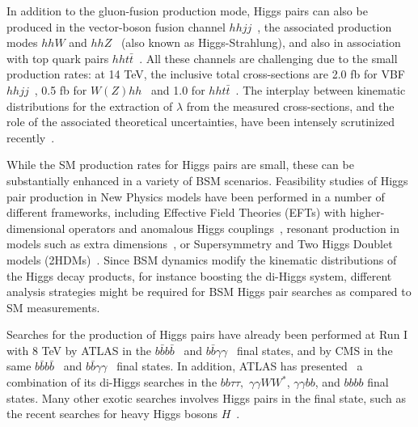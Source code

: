 In addition to the gluon-fusion production mode, Higgs pairs
can also be produced in the vector-boson fusion
channel $hhjj$~\cite{Contino:2010mh,Dolan:2013rja,Dolan:2015zja,
  Brooijmans:2014eja},
the associated production modes
$hhW$ and $hhZ$~\cite{Barger:1988jk,baglio,Cao:2015oxx}
(also known as Higgs-Strahlung),
and also in association
with top quark pairs $hht\bar{t}$~\cite{Englert:2014uqa}.
%
All these channels are challenging due to the small production
rates: at 14 TeV, the inclusive total cross-sections are
2.0 fb for VBF $hhjj$~\cite{Liu-Sheng:2014gxa},
0.5 fb for $W(Z)hh$~\cite{baglio}
and 1.0 for $hht\bar{t}$~\cite{Englert:2014uqa}.
%
The interplay between  kinematic
distributions for the
extraction of $\lambda$ from the measured
cross-sections, and the role of the associated theoretical
uncertainties, have been intensely scrutinized
recently~\cite{Slawinska:2014vpa,Chen:2014xra,Goertz:2013kp,
  Frederix:2014hta,Dawson:2015oha,Maltoni:2014eza,Maierhofer:2013sha,Grigo:2013rya,Grigo:2014jma}.
%


While the SM production rates for Higgs
pairs are small, these can be substantially
enhanced in a variety of BSM scenarios.
%
Feasibility studies of Higgs pair production in New Physics
models have been performed in a number of different frameworks,
including Effective Field
Theories (EFTs) with higher-dimensional
operators and anomalous 
Higgs couplings~\cite{Nishiwaki:2013cma,Dall'Osso:2015aia,Azatov:2015oxa,Liu:2014rba,Goertz:2014qta,He:2015spf,Grober:2015cwa}, resonant production
in models such as extra dimensions~\cite{Gouzevitch:2013qca,Cooper:2013kia,No:2013wsa}, or Supersymmetry and
Two Higgs Doublet models (2HDMs)~\cite{Belyaev:1999kk,Han:2013sga,Hespel:2014sla,Wu:2015nba,Cao:2014kya,Ellwanger:2013ova}.
%
Since BSM dynamics modify
the kinematic distributions of the Higgs decay products, for
instance boosting the di-Higgs system,
different analysis strategies  might be required for BSM
Higgs pair searches as compared to SM measurements.


Searches for the production of Higgs pairs
have already been performed at Run I with 8 TeV
by ATLAS in the $b\bar{b}b\bar{b}$~\cite{Aad:2015uka}
and $b\bar{b}\gamma\gamma$~\cite{Aad:2014yja} final states,
and by
CMS in the same $b\bar{b}b\bar{b}$~\cite{Khachatryan:2015yea}
and $b\bar{b}\gamma\gamma$~\cite{Chatrchyan:2011wt} final
states.
%
%
In addition, ATLAS has presented~\cite{Aad:2015xja} a combination
of its di-Higgs searches in the $bb\tau\tau,$
$\gamma\gamma WW^*$, $\gamma\gamma bb$, and $bbbb$ final states.
%
Many other exotic searches involves Higgs pairs in the final
state, such as the recent
searches for heavy Higgs bosons $H$~\cite{Khachatryan:2015tha}.



